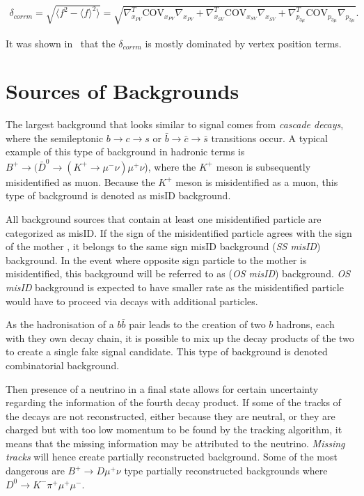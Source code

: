 \begin{equation}
\begin{aligned}
	\delta_{corrm} = \sqrt{ \langle f^{2}-\langle f \rangle^{2} \rangle} = \sqrt{\nabla^{T}_{x_{PV}} \mathrm{COV}_{x_{PV}} \nabla_{x_{PV}} + \nabla^{T}_{x_{SV}} \mathrm{COV}_{x_{SV}} \nabla_{x_{SV}} + \nabla^{T}_{p_{3\mu}} \mathrm{COV}_{p_{3\mu}} \nabla_{p_{3\mu}}}. 
\end{aligned}
\end{equation}

It was shown in~\cite{Egede:1694339} that the $\delta_{corrm}$ is mostly dominated by vertex position terms.

\section{Sources of Backgrounds}
\label{bkgquick}
The largest background that looks similar to signal comes from \textit{cascade decays}, where the semileptonic $b \rightarrow c \rightarrow s$ or $\bar{b} \rightarrow \bar{c} \rightarrow \bar{s}$ transitions occur. A typical example of this type of background in hadronic terms is $B^{+} \rightarrow (\bar{D}^{0} \rightarrow (K^{+} \rightarrow \mu^{-} \nu) \mu^{+} \nu$), where the $K^{+}$ meson is subsequently misidentified as muon. Because the $K^{+}$ meson is misidentified as a muon, this type of background is denoted as misID background.

All background sources that contain at least one misidentified particle are categorized as misID. If the sign of the misidentified particle agrees with the sign of the mother \Bpm, it belongs to the same sign misID background (\textit{SS misID}) background. In the event where opposite sign particle to the mother \Bpm is misidentified, this background will be referred to as (\textit{OS misID}) background. \textit{OS misID} background is expected to have smaller rate as the misidentified particle would have to proceed via decays with additional particles.

As the hadronisation of a $b\bar{b}$ pair leads to the creation of two $b$ hadrons, each with they own decay chain, it is possible to mix up the decay products of the two to create a single fake signal candidate. This type of background is denoted combinatorial background.

Then presence of a neutrino in a final state allows for certain uncertainty regarding the information of the fourth decay product. If some of the tracks of the decays are not reconstructed, either because they are neutral, or they are charged but with too low momentum to be found by the tracking algorithm, it means that the missing information may be attributed to the neutrino. \textit{Missing tracks} will hence create partially reconstructed background. Some of the most dangerous are ${B^{+} \rightarrow D \mu^{+} \nu}$ type partially reconstructed backgrounds where $D^0 \rightarrow K^- \pi^+ \mu^{+} \mu^{-}$.

